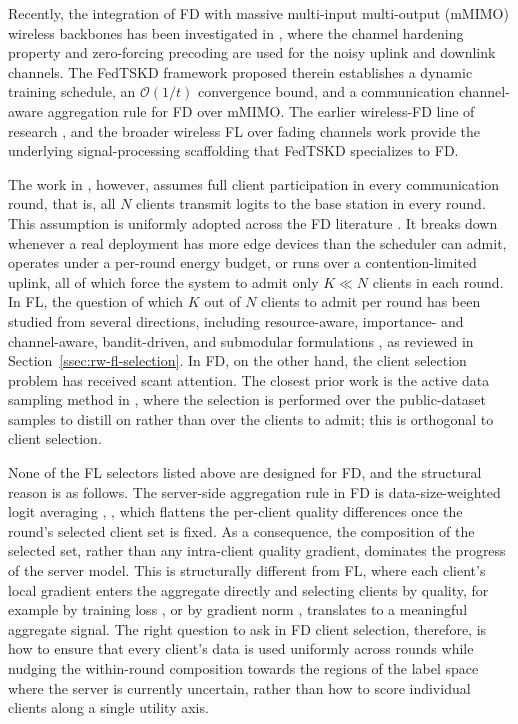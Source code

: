 \documentclass[journal]{IEEEtran}
\newcommand{\new}[1]{#1}
\begin{document}
Recently, the integration of FD with massive multi-input multi-output (mMIMO) wireless backbones has been investigated in \cite{mu2024fedtskd}, where the channel hardening property and zero-forcing precoding are used for the noisy uplink and downlink channels. The FedTSKD framework proposed therein establishes a dynamic training schedule, an $\mathcal{O}(1/t)$ convergence bound, and a communication channel-aware aggregation rule for FD over mMIMO. The earlier wireless-FD line of research \cite{ahn2019wireless}, \cite{ahn2020cooperative} and the broader wireless FL over fading channels work \cite{amiri2020federated, amiri2020machine, vu2020cell, amiri2021convergence} provide the underlying signal-processing scaffolding that FedTSKD specializes to FD.

The work in \cite{mu2024fedtskd}, however, assumes full client participation in every communication round, that is, all $N$ clients transmit logits to the base station in every round. This assumption is uniformly adopted across the FD literature \cite{itahara2023distillation, sattler2022cfd, sattler2023fedaux, wu2024fedict}. It breaks down whenever a real deployment has more edge devices than the scheduler can admit, operates under a per-round energy budget, or runs over a contention-limited uplink, all of which force the system to admit only $K \ll N$ clients in each round. \new{In FL, the question of which $K$ out of $N$ clients to admit per round has been studied from several directions, including resource-aware, importance- and channel-aware, bandit-driven, and submodular formulations \cite{nishio2019client, yang2020scheduling, ren2020scheduling, shi2020joint, xia2020mab, cho2020bandit, balakrishnan2022divfl}, as reviewed in Section~\ref{ssec:rw-fl-selection}.} In FD, on the other hand, the client selection problem has received scant attention. The closest prior work is the active data sampling method in \cite{liu2022active}, where the selection is performed over the public-dataset samples to distill on rather than over the clients to admit; this is orthogonal to client selection.

None of the FL selectors listed above are designed for FD, and the structural reason is as follows. The server-side aggregation rule in FD is data-size-weighted logit averaging \cite{mu2024fedtskd}, \cite{itahara2023distillation}, which flattens the per-client quality differences once the round's selected client set is fixed. As a consequence, the composition of the selected set, rather than any intra-client quality gradient, dominates the progress of the server model. This is structurally different from FL, where each client's local gradient enters the aggregate directly and selecting clients by quality, for example by training loss \cite{cho2020bandit}, \cite{xia2020mab} or by gradient norm \cite{wang2019adaptive}, translates to a meaningful aggregate signal. The right question to ask in FD client selection, therefore, is how to ensure that every client's data is used uniformly across rounds while nudging the within-round composition towards the regions of the label space where the server is currently uncertain, rather than how to score individual clients along a single utility axis.
\end{document}
